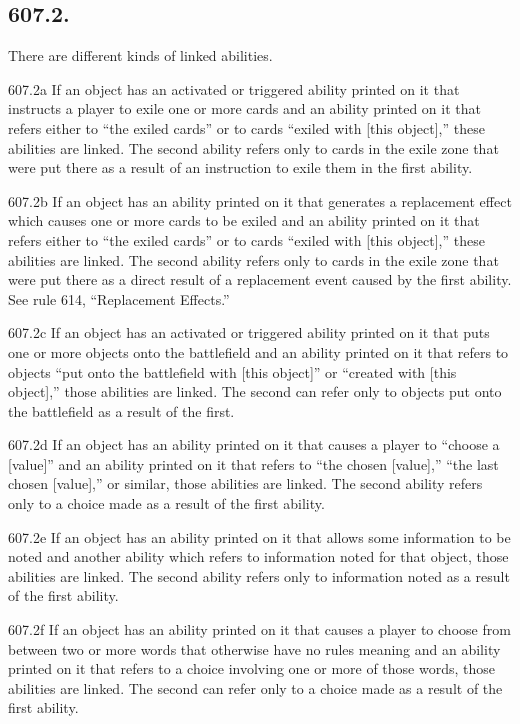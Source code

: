 \subsection*{607.2.}
There are different kinds of linked abilities.

607.2a If an object has an activated or triggered ability printed on it that instructs a player to exile one or more cards and an ability printed on it that refers either to “the exiled cards” or to cards “exiled with [this object],” these abilities are linked. The second ability refers only to cards in the exile zone that were put there as a result of an instruction to exile them in the first ability.

607.2b If an object has an ability printed on it that generates a replacement effect which causes one or more cards to be exiled and an ability printed on it that refers either to “the exiled cards” or to cards “exiled with [this object],” these abilities are linked. The second ability refers only to cards in the exile zone that were put there as a direct result of a replacement event caused by the first ability. See rule 614, “Replacement Effects.”

607.2c If an object has an activated or triggered ability printed on it that puts one or more objects onto the battlefield and an ability printed on it that refers to objects “put onto the battlefield with [this object]” or “created with [this object],” those abilities are linked. The second can refer only to objects put onto the battlefield as a result of the first.

607.2d If an object has an ability printed on it that causes a player to “choose a [value]” and an ability printed on it that refers to “the chosen [value],” “the last chosen [value],” or similar, those abilities are linked. The second ability refers only to a choice made as a result of the first ability.

607.2e If an object has an ability printed on it that allows some information to be noted and another ability which refers to information noted for that object, those abilities are linked. The second ability refers only to information noted as a result of the first ability.

607.2f If an object has an ability printed on it that causes a player to choose from between two or more words that otherwise have no rules meaning and an ability printed on it that refers to a choice involving one or more of those words, those abilities are linked. The second can refer only to a choice made as a result of the first ability.

